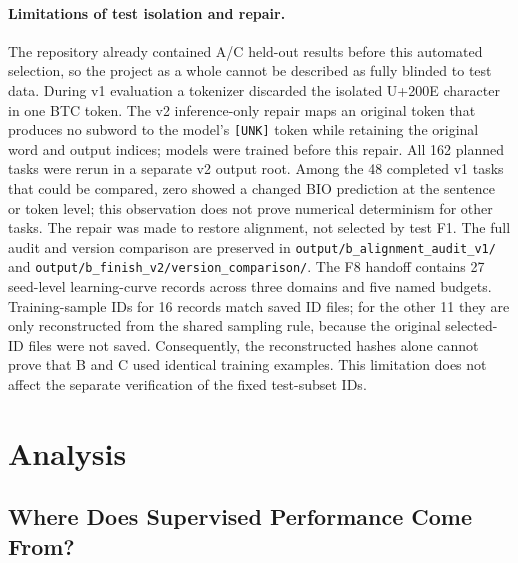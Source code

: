 \paragraph{Limitations of test isolation and repair.}
The repository already contained A/C held-out results before this automated
selection, so the project as a whole cannot be described as fully blinded to
test data. During v1 evaluation a tokenizer discarded the isolated U+200E
character in one BTC token. The v2 inference-only repair maps an original
token that produces no subword to the model's \texttt{[UNK]} token while
retaining the original word and output indices; models were trained before
this repair. All 162 planned tasks were rerun in a separate v2 output root.
Among the 48 completed v1 tasks that could be compared, zero showed a changed
BIO prediction at the sentence or token level; this observation does not
prove numerical determinism for other tasks. The repair was made to restore
alignment, not selected by test F1. The full audit and version comparison are
preserved in \texttt{output/b\_alignment\_audit\_v1/} and
\texttt{output/b\_finish\_v2/version\_comparison/}.
The F8 handoff contains 27 seed-level learning-curve records across three
domains and five named budgets. Training-sample IDs for 16 records match
saved ID files; for the other 11 they are only reconstructed from the shared
sampling rule, because the original selected-ID files were not saved.
Consequently, the reconstructed hashes alone cannot prove that B and C used
identical training examples. This limitation does not affect the separate
verification of the fixed test-subset IDs.

\section{Analysis}
\subsection{Where Does Supervised Performance Come From?}
\label{sec:b-representations}

